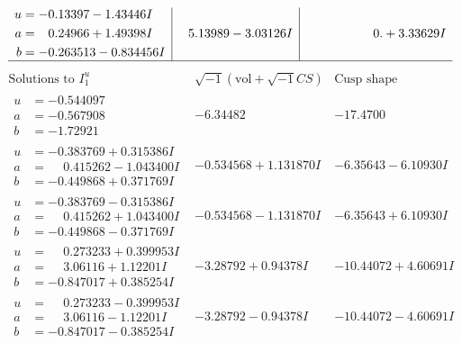 \documentclass[1p]{elsarticle_modified}
\theoremstyle{definition}
\newcommand{\I}{\sqrt{-1}}
\begin{document}
$$\begin{array}{c|c|c}
\begin{aligned}
u &= -0.13397 - 1.43446 I \\
a &= \phantom{-}0.24966 + 1.49398 I \\
b &= -0.263513 - 0.834456 I\end{aligned}
 & \phantom{-}5.13989 - 3.03126 I & \phantom{-0.000000 -}0. + 3.33629 I\\
 \hline 
 \end{array}$$\newpage$$\begin{array}{c|c|c}  
\text{Solutions to }I^u_{1}& \I (\text{vol} + \sqrt{-1}CS) & \text{Cusp shape}\\
 \hline 
\begin{aligned}
u &= -0.544097\phantom{ +0.000000I} \\
a &= -0.567908\phantom{ +0.000000I} \\
b &= -1.72921\phantom{ +0.000000I}\end{aligned}
 & -6.34482\phantom{ +0.000000I} & -17.4700\phantom{ +0.000000I} \\ \hline\begin{aligned}
u &= -0.383769 + 0.315386 I \\
a &= \phantom{-}0.415262 - 1.043400 I \\
b &= -0.449868 + 0.371769 I\end{aligned}
 & -0.534568 + 1.131870 I & -6.35643 - 6.10930 I \\ \hline\begin{aligned}
u &= -0.383769 - 0.315386 I \\
a &= \phantom{-}0.415262 + 1.043400 I \\
b &= -0.449868 - 0.371769 I\end{aligned}
 & -0.534568 - 1.131870 I & -6.35643 + 6.10930 I \\ \hline\begin{aligned}
u &= \phantom{-}0.273233 + 0.399953 I \\
a &= \phantom{-}3.06116 + 1.12201 I \\
b &= -0.847017 + 0.385254 I\end{aligned}
 & -3.28792 + 0.94378 I & -10.44072 + 4.60691 I \\ \hline\begin{aligned}
u &= \phantom{-}0.273233 - 0.399953 I \\
a &= \phantom{-}3.06116 - 1.12201 I \\
b &= -0.847017 - 0.385254 I\end{aligned}
 & -3.28792 - 0.94378 I & -10.44072 - 4.60691 I \\ \hline\begin{aligned}

\end{aligned}
\end{array}$$
\end{document}

